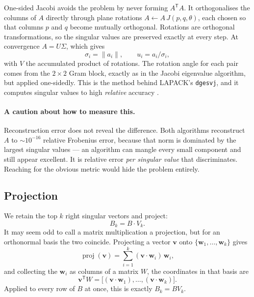 \documentclass[11pt]{article}
\newcommand{\code}[1]{\texttt{\small #1}}
\begin{document}
One-sided Jacobi avoids the problem by never forming $A^{\mathsf{T}}A$. It
orthogonalises the columns of $A$ directly through plane rotations
$A \leftarrow A\, J(p,q,\theta)$, each chosen so that columns $p$ and $q$
become mutually orthogonal. Rotations are orthogonal transformations, so the
singular values are preserved exactly at every step. At convergence
$A = U\Sigma$, which gives
\begin{equation}
  \sigma_i = \lVert a_i \rVert, \qquad u_i = a_i / \sigma_i,
\end{equation}
with $V$ the accumulated product of rotations. The rotation angle for each pair
comes from the $2\times2$ Gram block, exactly as in the Jacobi eigenvalue
algorithm, but applied one-sidedly. This is the method behind LAPACK's
\code{dgesvj}, and it computes singular values to high \emph{relative} accuracy
\cite{demmel1992}.

\paragraph{A caution about how to measure this.} Reconstruction error does not
reveal the difference. Both algorithms reconstruct $A$ to $\sim 10^{-16}$
relative Frobenius error, because that norm is dominated by the largest
singular values --- an algorithm can mangle every small component and still
appear excellent. It is relative error \emph{per singular value} that
discriminates. Reaching for the obvious metric would hide the problem
entirely.

\subsection{Projection}

We retain the top $k$ right singular vectors and project:
\begin{equation}
  B_k = B \cdot V_k .
\end{equation}
It may seem odd to call a matrix multiplication a projection, but for an
orthonormal basis the two coincide. Projecting a vector $\mathbf{v}$ onto
$\{\mathbf{w}_1,\dots,\mathbf{w}_k\}$ gives
\begin{equation}
  \operatorname{proj}(\mathbf{v}) = \sum_{i=1}^{k} (\mathbf{v}\cdot\mathbf{w}_i)\,\mathbf{w}_i ,
\end{equation}
and collecting the $\mathbf{w}_i$ as columns of a matrix $W$, the coordinates
in that basis are
\begin{equation}
  \mathbf{v}^{\mathsf{T}} W = \big[(\mathbf{v}\cdot\mathbf{w}_1), \ldots, (\mathbf{v}\cdot\mathbf{w}_k)\big].
\end{equation}
Applied to every row of $B$ at once, this is exactly $B_k = B V_k$.
\end{document}
